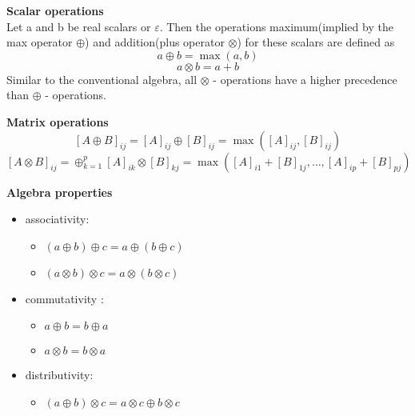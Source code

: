 \documentclass{book}
\begin{document}
\textbf{Scalar operations}\\
Let a and b be real scalars or $\varepsilon$.
Then the operations maximum(implied by the max operator $\oplus$) and addition(plus operator $\otimes$) for these scalars are defined as
$$ a \oplus b = \max(a,b) $$
$$ a \otimes b = a + b $$
Similar to the conventional algebra, all $\otimes$ - operations have a higher precedence than $\oplus$ - operations.

\textbf{Matrix operations}\\
$$ [A \oplus B]_{ij} = [A]_{ij} \oplus [B]_{ij} = \max([A]_{ij} , [B]_{ij}) $$
$$ [A \otimes B]_{ij} = \oplus_{k = 1}^p [A]_{ik} \otimes [B]_{kj} = \max([A]_{i1} + [B]_{1j}, \dots, [A]_{ip} + [B]_{pj}) $$

\textbf{Algebra properties}\\
\begin{itemize}
\item associativity:
	\begin{itemize}
	\item $(a \oplus b) \oplus c = a \oplus (b \oplus c) $
	\item $(a\otimes b) \otimes c = a \otimes (b \otimes c)$
	\end{itemize}
\item commutativity :
	\begin{itemize}
	\item $a \oplus b = b \oplus a $
	\item $a \otimes b = b \otimes a $
	\end{itemize}
\item distributivity:
	\begin{itemize}
	\item  $(a \oplus b) \otimes c = a \otimes c \oplus b \otimes c $
	\end{itemize}
\end{itemize}
\end{document}
